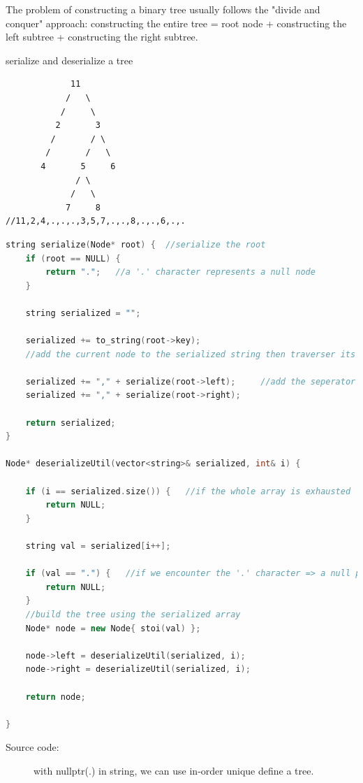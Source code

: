 \documentclass[a4paper,11pt,twoside]{book}
\begin{document}
	\par The problem of constructing a binary tree usually follows the "divide and conquer" approach: constructing the entire tree = root node + constructing the left subtree + constructing the right subtree.
	
	\par serialize and deserialize a tree
	
\begin{lstlisting}
             11
            /   \
           /     \
          2       3
         /       / \
        /       /   \
       4       5     6
              / \
             /   \
            7     8
//11,2,4,.,.,.,3,5,7,.,.,8,.,.,6,.,.
\end{lstlisting}

\begin{lstlisting}[frame=single, language=c++]
string serialize(Node* root) {  //serialize the root
	if (root == NULL) {
		return ".";   //a '.' character represents a null node
	}
	
	string serialized = "";
	
	serialized += to_string(root->key);  
	//add the current node to the serialized string then traverser its left and right children respectively
	
	serialized += "," + serialize(root->left);     //add the seperator after each node
	serialized += "," + serialize(root->right);
	
	return serialized;
}

Node* deserializeUtil(vector<string>& serialized, int& i) {
	
	if (i == serialized.size()) {   //if the whole array is exhausted
		return NULL;
	}
	
	string val = serialized[i++];
	
	if (val == ".") {   //if we encounter the '.' character => a null pointer
		return NULL;
	}
	//build the tree using the serialized array
	Node* node = new Node{ stoi(val) };
	
	node->left = deserializeUtil(serialized, i);
	node->right = deserializeUtil(serialized, i);
	
	return node;
	
}
\end{lstlisting}
\begin{description}
\item[Source code:] with nullptr(.) in string, we can use in-order unique define a tree.
\end{description}
	
\end{document}
